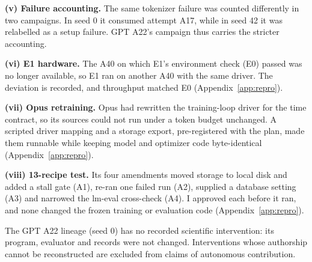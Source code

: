 \documentclass{article}
\begin{document}
{ \textbf{(v) Failure accounting.} The same tokenizer failure was counted differently in two campaigns. In seed 0 it consumed attempt A17, while in seed 42 it was relabelled as a setup failure. GPT A22's campaign thus carries the stricter accounting.

 \textbf{(vi) E1 hardware.} The A40 on which E1's environment check (E0) passed was no longer available, so E1 ran on another A40 with the same driver. The deviation is recorded, and throughput matched E0 (Appendix~\ref{app:repro}).

 \textbf{(vii) Opus retraining.} Opus had rewritten the training-loop driver for the time contract, so its sources could not run under a token budget unchanged. A scripted driver mapping and a storage export, pre-registered with the plan, made them runnable while keeping model and optimizer code byte-identical (Appendix~\ref{app:repro}).

 \textbf{(viii) 13-recipe test.} Its four amendments moved storage to local disk and added a stall gate (A1), re-ran one failed run (A2), supplied a database setting (A3) and narrowed the lm-eval cross-check (A4). I approved each before it ran, and none changed the frozen training or evaluation code (Appendix~\ref{app:repro}).

 The GPT A22 lineage (seed 0) has no recorded scientific intervention: its program, evaluator and records were not changed. Interventions whose authorship cannot be reconstructed are excluded from claims of autonomous contribution.}
\end{document}
